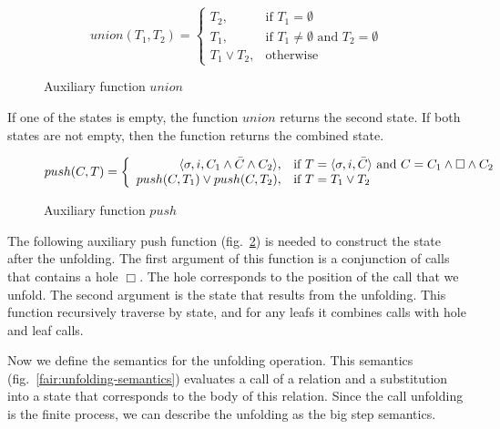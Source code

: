 \begin{figure}[h!]
\[
union(T_1, T_2) =
\left\{
\begin{array}{rl}
T_2, & \mbox{if } T_1 = \emptyset \\
T_1, & \mbox{if } T_1 \not= \emptyset \mbox{ and } T_2 = \emptyset \\
T_1 \lor T_2, & \mbox{otherwise}
\end{array}
\right.
\]
\caption{Auxiliary function $union$}
\label{fair:union-semantics}
\end{figure}


If one of the states is empty, the function $union$ returns the second state. If both states are not empty, then the function returns the combined state.

\begin{figure}[h!]
\[
push(C, T) =
\left\{
\begin{array}{rl}
\langle \sigma, i, C_1 \land \bar{C} \land C_2 \rangle, & \mbox{if } T = \langle \sigma, i, \bar{C} \rangle \mbox{ and } C = C_1 \land \Box \land C_2 \\
push(C, T_1) \lor push(C, T_2), & \mbox{if } T = T_1 \lor T_2
\end{array}
\right.
\]
\caption{Auxiliary function $push$}
\label{fair:push-semantics}
\end{figure}


The following auxiliary push function (fig.~\ref{fair:push-semantics}) is needed to construct the state after the unfolding. 
The first argument of this function is a conjunction of calls that contains a hole $\Box$. 
The hole corresponds to the position of the call that we unfold. 
The second argument is the state that results from the unfolding. 
This function recursively traverse by state, and for any leafs it combines calls with hole and leaf calls.

Now we define the semantics for the unfolding operation. This semantics (fig.~\ref{fair:unfolding-semantics}) evaluates a call of a relation and a substitution into a state that corresponds to the body of this relation. Since the call unfolding is the finite process, we can describe the unfolding as the big step semantics.

